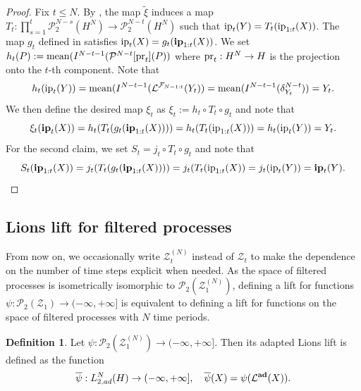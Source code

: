 \documentclass[a4paper]{amsart}
\numberwithin{theorem}{section}
\theoremstyle{definition}
\newtheorem{definition}[theorem]{Definition}
\newcommand{\F}{\mathcal{F}}
\newcommand{\pr}{\textup{pr}}
\newcommand{\law}{\mathcal{L}}
\newcommand{\Pc}{\mathcal P}
\newcommand{\mean}[1]{\mathrm{mean}(#1)}
\renewcommand{\H}{H}
\newcommand{\ip}{\textup{ip}}
\newcommand{\Zc}{\mathcal{Z}}
\newcommand{\ipp}{\mathbf{ip}}
\newcommand{\lawadd}{\law^{\textnormal{\textbf{ad}}}}
\begin{document}
\begin{proof}
Fix $t \le N$. By , the map $\tilde\xi$ induces a map 
$
T_t : \prod_{s=1}^t   \Pc_2^{N-s}(H^N)  \to \Pc_2^{N-t}(H^N)  
$
such that $\ip_t(Y) = T_t(\ip_{1:t}(X))$. The map $g_t$ defined in  satisfies $\ip_t(X) = g_t(\ipp_{1:t}(X))$. We set $h_t(P) := \mean{ I^{N-t-1}(\Pc^{N-t}[\pr_t](P)}$ where $\pr_t : H^N \to H$ is the projection onto the $t$-th component. Note that 
$$
h_t(\ip_t(Y)) = \mean{ I^{N-t-1}(\law^{\F_{N-1:t}} (Y_t) } = \mean{ I^{N-t-1}(\delta^{N-t}_{Y_t})} = Y_t.
$$
We then define the desired map $\xi_t$ as 
$
\xi_t := h_t \circ T_t \circ g_t
$
and note that
\[
\xi_t(\ipp_t(X)) = h_t ( T_t (g_t( \ipp_{1:t}(X)))) = h_t(T_t(\ip_{1:t}(X))) = h_t(\ip_t(Y)) =  Y_t. 
\]
For the second claim, we set $S_t = j_t \circ T_t \circ g_t$ and note that 
\[
    S_t(\ipp_{1:t}(X)) = j_t(T_t(g_t(\ipp_{1:t}(X)))) = j_t(T_t(\ip_{1:t}(X)) = j_t(\ip_t(Y)) = \ipp_t(Y). \qedhere
\]
\end{proof}










\subsection{Lions lift for filtered processes}
\label{sec:LionsLiftFP}
From now on, we occasionally write $\mathcal{Z}_t^{(N)}$ instead of $\mathcal{Z}_t$ to make the dependence on the number of time steps explicit when needed. As the space of filtered processes is isometrically isomorphic to $\Pc_2(\Zc_1^{(N)})$, defining a lift for functions $\psi : \Pc_2(\Zc_1) \to (-\infty,+\infty]$ is equivalent to defining a lift for functions on the space of filtered processes with $N$ time periods.


\begin{definition}
Let $\psi : \Pc_2(\Zc_1^{(N)}) \to (-\infty,+\infty]$. Then its adapted Lions lift is defined as the function 
\[
\overline{\psi} : L_{2,ad}^N(\H) \to (-\infty,+\infty], \quad \overline{\psi}(X) = \psi(\lawadd(X)).
\]  
\end{definition}
\end{document}
